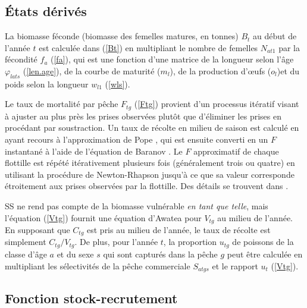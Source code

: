 \documentclass[11pt]{book}
\newcommand{\eref}[1]{(\ref{#1})}
\begin{document}
\subsection{\'{E}tats d\'{e}riv\'{e}s}

La biomasse f\'{e}conde (biomasse des femelles matures, en tonnes) $B_t$ au d\'{e}but de l'ann\'{e}e $t$ est calcul\'{e}e dans \eref{Bt} en multipliant le nombre de femelles $N_{at1}$ par la f\'{e}condit\'{e} $f_a$ \eref{fa}, qui est une fonction d'une matrice de la longueur selon l'\^{a}ge $\varphi_{lats}$ \eref{len.age}, de la courbe de maturit\'{e} ($m_l$), de la production d'{\oe}ufs ($o_l$)et du poids selon la longueur $w_{l1}$ \eref{wls}.

Le taux de mortalit\'{e} par p\^{e}che $F_{tg}$ \eref{Ftg} provient d'un processus it\'{e}ratif visant \`{a} ajuster au plus pr\`{e}s les prises observ\'{e}es plut\^{o}t que d'\'{e}liminer les prises en proc\'{e}dant par soustraction.
Un taux de r\'{e}colte en milieu de saison est calcul\'{e} en ayant recours \`{a} l'approximation de Pope \citep{Pope:1972}, qui est ensuite converti en un $F$ instantan\'{e} \`{a} l'aide de l'\'{e}quation de Baranov \citep{Baranov:1918}.
Le $F$ approximatif de chaque flottille est r\'{e}p\'{e}t\'{e} it\'{e}rativement plusieurs fois (g\'{e}n\'{e}ralement trois ou quatre) en utilisant la proc\'{e}dure de Newton-Rhapson jusqu'\`{a} ce que sa valeur corresponde \'{e}troitement aux prises observ\'{e}es par la flottille.
Des d\'{e}tails se trouvent dans \citet{Methot-Wetzel:2013}.

SS ne rend pas compte de la biomasse vuln\'{e}rable \textit{en tant que telle}, mais l'\'{e}quation \eref{Vtg} fournit une \'{e}quation d'Awatea pour $V_{tg}$ au milieu de l'ann\'{e}e.
En supposant que $C_{tg}$ est pris au milieu de l'ann\'{e}e, le taux de r\'{e}colte est simplement $C_{tg} / V_{tg}$.
De plus, pour l'ann\'{e}e $t$, la proportion $u_{tg}$ de poissons de la classe d'\^{a}ge $a$ et du sexe $s$ qui sont captur\'{e}s dans la p\^{e}che $g$ peut \^{e}tre calcul\'{e}e en multipliant les s\'{e}lectivit\'{e}s de la p\^{e}che commerciale $S_{atgs}$ et le rapport $u_t$ \eref{Vtg}.

\subsection{Fonction stock-recrutement}
\end{document}
